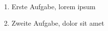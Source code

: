 \begin{enumerate}
	\item Erste Aufgabe, lorem ipsum
	\item Zweite Aufgabe, dolor sit amet
\end{enumerate}
